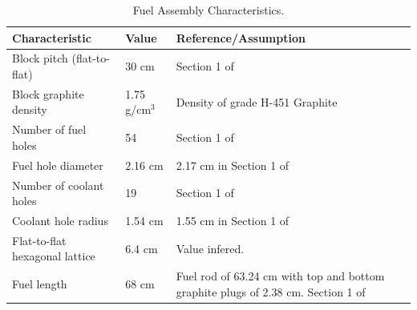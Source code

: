 \documentclass[11pt,letterpaper]{article}
\begin{document}
	\begin{table}[htbp!]
		\centering
	    \caption{Fuel Assembly Characteristics.}
	    \label{tab:fuel}
		\begin{tabular}{l|l|l}
		\hline
		Characteristic                   & Value         & Reference/Assumption \\ \hline
		Block pitch (flat-to-flat)       & 30 cm         & Section 1 of \cite{hawari_development_2018} \\
		Block graphite density           & 1.75 g/cm$^3$ & Density of grade H-451 Graphite \cite{gougar_prismatic_2010} \\
		Number of fuel holes             & 54            & Section 1 of \cite{hawari_development_2018} \\
		Fuel hole diameter               & 2.16 cm       & 2.17 cm in Section 1 of \cite{hawari_development_2018} \\
		Number of coolant holes          & 19            & Section 1 of \cite{hawari_development_2018} \\
		Coolant hole radius        		 & 1.54 cm       & 1.55 cm in Section 1 of \cite{hawari_development_2018} \\
		Flat-to-flat hexagonal lattice   & 6.4 cm        & Value infered. \\
		Fuel length                      & 68 cm         & Fuel rod of 63.24 cm with top and bottom graphite plugs of 2.38 cm. Section 1 of \cite{hawari_development_2018} \\ \hline
		\end{tabular}
	\end{table}
\end{document}
